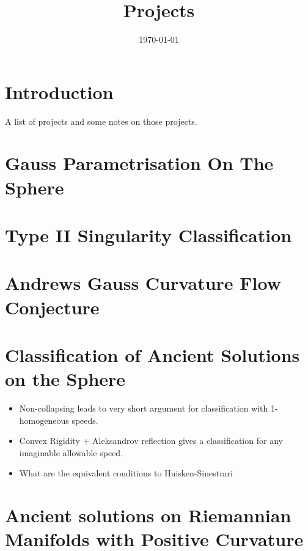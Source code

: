 \documentclass{amsart}
\begin{document}
\title{Projects}

\curraddr{}
\email{}
\date{\today}

\dedicatory{}
\subjclass[2010]{}
\keywords{}

\begin{abstract}
\end{abstract}

\maketitle

\section{Introduction}

A list of projects and some notes on those projects.

\section{Gauss Parametrisation On The Sphere}

\section{Type II Singularity Classification}

\section{Andrews Gauss Curvature Flow Conjecture}

\section{Classification of Ancient Solutions on the Sphere}

\begin{itemize}
\item Non-collapsing leads to very short argument for classification with 1-homogeneous speeds.
\item Convex Rigidity + Aleksandrov reflection gives a classification for any imaginable allowable speed.
\item What are the equivalent conditions to Huisken-Sinestrari
\end{itemize}

\section{Ancient solutions on Riemannian Manifolds with Positive Curvature}


\section{}



\end{document}
